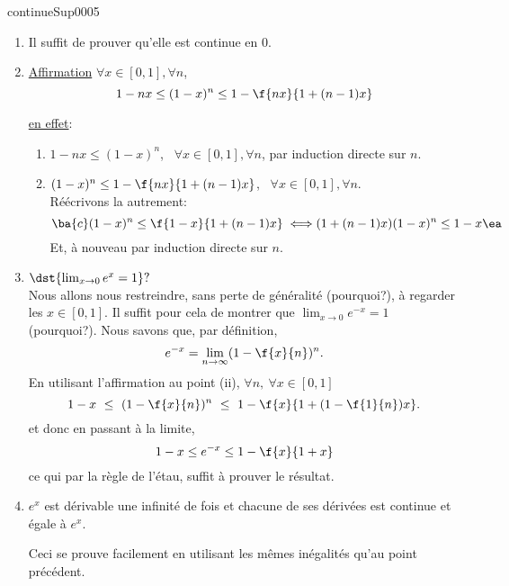 
\begin{corrige}{continueSup0005}


\begin{enumerate}
\item Il suffit de prouver qu'elle est continue en $0$.
\item%
\underline{Affirmation} $\forall  x \in [0,1], \forall n$,  \[1-nx\leq(1-x)^n\leq 1 - \f{nx}{1+(n-1)x}\]

\underline{en effet}: 
\begin{enumerate}
\item $1-nx\leq(1-x)^n$, \ $\forall  x \in [0,1], \forall n$, par induction  directe sur $n$.
\item $(1-x)^n\leq 1 - \f{nx}{1+(n-1)x}$, \ $\forall  x \in [0,1], \forall n$.\\
Réécrivons la autrement: 
\[ \ba{c}  (1-x)^n \leq  \f{1-x}{1+(n-1)x} \\  \iff \\ (1+(n-1)x)(1-x)^n\leq 1-x\ea\]
Et, à nouveau par induction directe sur $n$.

\end{enumerate}

\item $\dst{\lim_{x\rightarrow 0}e^x=1}?$\\ Nous allons nous restreindre, sans perte de généralité (pourquoi?),  à regarder les $x\in [0,1]$. Il suffit pour cela de montrer que $\lim_{x\rightarrow 0}e^{-x}=1$ (pourquoi?).
Nous savons que, par définition,  \[e^{-x} = \lim_{n\rightarrow 	\infty}(1-\f{x}{n})^n.\] 
En utilisant l'affirmation au point (ii),  $\forall n, \ \forall x\in [0,1]$
\[ 1-x \  \leq \ (1-\f{x}{n})^n \ \leq \  1-\f{x}{1+(1-\f{1}{n})x}. \]
 et donc en passant à la limite,
\[1-x \leq e^{-x} \leq 1-\f{x}{1+x}\]
ce qui par la règle de l'étau, suffit à prouver le résultat. 
\item $e^x$ est dérivable une infinité de fois et chacune de ses dérivées est continue et égale à $e^x$.

Ceci se prouve  facilement en utilisant les mêmes inégalités qu'au point précédent.
\end{enumerate}

\end{corrige}
